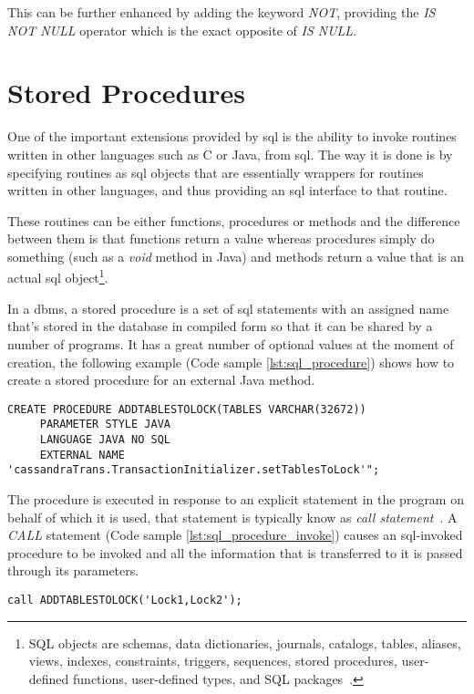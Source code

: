 This can be further enhanced by adding the keyword \emph{NOT}, providing the \emph{IS NOT NULL} operator which is the exact opposite of \emph{IS NULL}. 

\section{Stored Procedures}
\label{sec:stored_procedures}
One of the important extensions provided by \ac{sql} is the ability to invoke routines written in other languages such as C or Java, from \ac{sql}. The way it is done is by specifying routines as \ac{sql} objects that are essentially wrappers for routines written in other languages, and thus providing an \ac{sql} interface to that routine. 

These routines can be either functions, procedures or methods and the difference between them is that functions return a value whereas procedures simply do something (such as a \emph{void} method in Java) and methods return a value that is an actual \ac{sql} object\footnote{SQL objects are schemas, data dictionaries, journals, catalogs, tables, aliases, views, indexes, constraints, triggers, sequences, stored procedures, user-defined functions, user-defined types, and SQL packages~\cite{ibmSql}.}.

In a \ac{dbms}, a stored procedure is a set of \ac{sql} statements with an assigned name that's stored in the database in compiled form so that it can be shared by a number of programs. It has a great number of optional values at the moment of creation, the following example (Code sample \ref{lst:sql_procedure}) shows how to create a stored procedure for an external Java method.

\lstset{
  language=SQL, 
  caption=SQL procedure creation, 
  label=lst:sql_procedure,
}

\begin{shaded}
\begin{lstlisting}
CREATE PROCEDURE ADDTABLESTOLOCK(TABLES VARCHAR(32672)) 
     PARAMETER STYLE JAVA 
     LANGUAGE JAVA NO SQL 
     EXTERNAL NAME 'cassandraTrans.TransactionInitializer.setTablesToLock'";
\end{lstlisting}  
\end{shaded}

The procedure is executed in response to an explicit statement in the program on behalf of which it is used, that statement is typically know as \emph{call statement}~\cite{Melton:2002:ASU:863098}. A \emph{CALL} statement (Code sample \ref{lst:sql_procedure_invoke}) causes an \ac{sql}-invoked procedure to be invoked and all the information that is transferred to it is passed through its parameters.

\lstset{
  language=SQL, 
  caption=SQL invoking a procedure, 
  label=lst:sql_procedure_invoke,
}

\begin{shaded}
\begin{lstlisting}
call ADDTABLESTOLOCK('Lock1,Lock2');
\end{lstlisting}  
\end{shaded}

 
